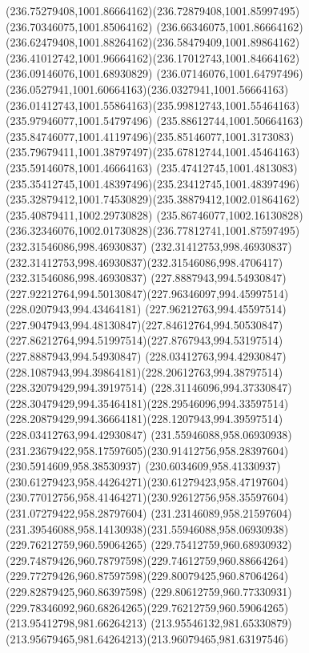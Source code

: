{    \curveto(236.75279408,1001.86664162)(236.72879408,1001.85997495)(236.70346075,1001.85064162)
    \curveto(236.66346075,1001.86664162)(236.62479408,1001.88264162)(236.58479409,1001.89864162)
    \curveto(236.41012742,1001.96664162)(236.17012743,1001.84664162)(236.09146076,1001.68930829)
    \curveto(236.07146076,1001.64797496)(236.0527941,1001.60664163)(236.0327941,1001.56664163)
    \curveto(236.01412743,1001.55864163)(235.99812743,1001.55464163)(235.97946077,1001.54797496)
    \curveto(235.88612744,1001.50664163)(235.84746077,1001.41197496)(235.85146077,1001.3173083)
    \curveto(235.79679411,1001.38797497)(235.67812744,1001.45464163)(235.59146078,1001.46664163)
    \curveto(235.47412745,1001.4813083)(235.35412745,1001.48397496)(235.23412745,1001.48397496)
    \curveto(235.32879412,1001.74530829)(235.38879412,1002.01864162)(235.40879411,1002.29730828)
    \curveto(235.86746077,1002.16130828)(236.32346076,1002.01730828)(236.77812741,1001.87597495)
    \moveto(232.31546086,998.46930837)
    \lineto(232.31412753,998.46930837)
    \curveto(232.31412753,998.46930837)(232.31546086,998.4706417)(232.31546086,998.46930837)
    \closepath
    \moveto(227.8887943,994.54930847)
    \curveto(227.92212764,994.50130847)(227.96346097,994.45997514)(228.0207943,994.43464181)
    \curveto(227.96212763,994.45597514)(227.9047943,994.48130847)(227.84612764,994.50530847)
    \curveto(227.86212764,994.51997514)(227.8767943,994.53197514)(227.8887943,994.54930847)
    \moveto(228.03412763,994.42930847)
    \curveto(228.1087943,994.39864181)(228.20612763,994.38797514)(228.32079429,994.39197514)
    \curveto(228.31146096,994.37330847)(228.30479429,994.35464181)(228.29546096,994.33597514)
    \curveto(228.20879429,994.36664181)(228.1207943,994.39597514)(228.03412763,994.42930847)
    \moveto(231.55946088,958.06930938)
    \curveto(231.23679422,958.17597605)(230.91412756,958.28397604)(230.5914609,958.38530937)
    \curveto(230.6034609,958.41330937)(230.61279423,958.44264271)(230.61279423,958.47197604)
    \curveto(230.77012756,958.41464271)(230.92612756,958.35597604)(231.07279422,958.28797604)
    \curveto(231.23146089,958.21597604)(231.39546088,958.14130938)(231.55946088,958.06930938)
    \moveto(229.76212759,960.59064265)
    \curveto(229.75412759,960.68930932)(229.74879426,960.78797598)(229.74612759,960.88664264)
    \curveto(229.77279426,960.87597598)(229.80079425,960.87064264)(229.82879425,960.86397598)
    \curveto(229.80612759,960.77330931)(229.78346092,960.68264265)(229.76212759,960.59064265)
    \moveto(213.95412798,981.66264213)
    \curveto(213.95546132,981.65330879)(213.95679465,981.64264213)(213.96079465,981.63197546)
}
